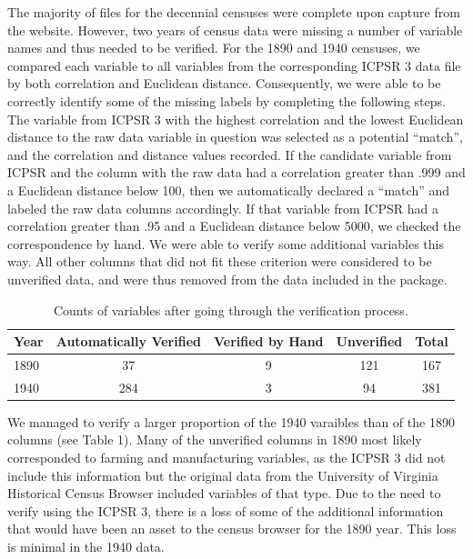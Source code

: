 \documentclass[11pt,]{article}
\begin{document}
The majority of files for the decennial censuses were complete upon
capture from the website. However, two years of census data were missing
a number of variable names and thus needed to be verified. For the 1890
and 1940 censuses, we compared each variable to all variables from the
corresponding ICPSR 3 data file by both correlation and Euclidean
distance. Consequently, we were able to be correctly identify some of
the missing labels by completing the following steps. The variable from
ICPSR 3 with the highest correlation and the lowest Euclidean distance
to the raw data variable in question was selected as a potential
``match'', and the correlation and distance values recorded. If the
candidate variable from ICPSR and the column with the raw data had a
correlation greater than .999 and a Euclidean distance below 100, then
we automatically declared a ``match'' and labeled the raw data columns
accordingly. If that variable from ICPSR had a correlation greater than
.95 and a Euclidean distance below 5000, we checked the correspondence
by hand. We were able to verify some additional variables this way. All
other columns that did not fit these criterion were considered to be
unverified data, and were thus removed from the data included in the
package.

\begin{table}[H]
\centering

  \begin{tabular}{l|c|c|c|c}
  \hline
  Year & Automatically Verified & Verified by Hand & Unverified & Total \\ \hline
  1890 & 37 & 9 & 121 & 167 \\ 
  1940 & 284 & 3 & 94 & 381 \\ 
  \end{tabular}

  \caption{Counts of variables after going through the verification process.}
  \label{verify-table}
\end{table}

We managed to verify a larger proportion of the 1940 varaibles than of
the 1890 columns (see Table 1). Many of the unverified columns in 1890
most likely corresponded to farming and manufacturing variables, as the
ICPSR 3 did not include this information but the original data from the
University of Virginia Historical Census Browser included variables of
that type. Due to the need to verify using the ICPSR 3, there is a loss
of some of the additional information that would have been an asset to
the census browser for the 1890 year. This loss is minimal in the 1940
data.
\end{document}
